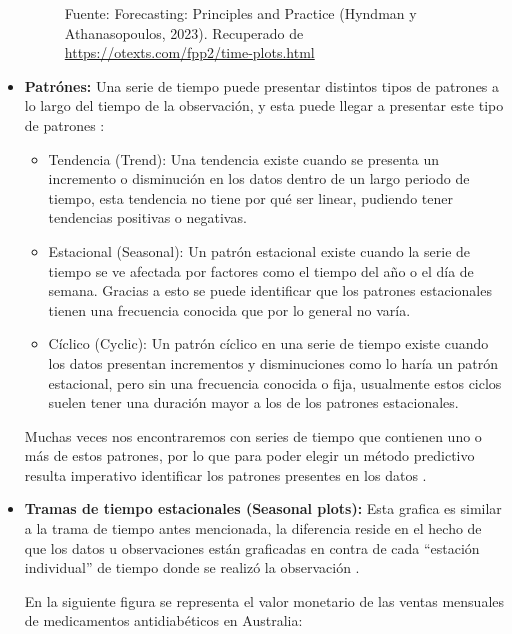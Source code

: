 \begin{itemize}
\begin{figure}[H]
        \begin{minipage}[t]{0.9\textwidth}
            Fuente: Forecasting: Principles and Practice (Hyndman y Athanasopoulos, 2023). Recuperado de \url{https://otexts.com/fpp2/time-plots.html}
        \end{minipage}
    \end{figure}
    
    \item \textbf{Patrónes:} Una serie de tiempo puede presentar distintos tipos de patrones a lo largo del tiempo de la observación, y esta puede llegar a presentar este tipo de patrones \cite{forecast-time-series-arima}:
        \begin{itemize}
            \item Tendencia (Trend): Una tendencia existe cuando se presenta un incremento o disminución en los datos dentro de un largo periodo de tiempo, esta tendencia no tiene por qué ser linear, pudiendo tener tendencias positivas o negativas.
            \item Estacional (Seasonal): Un patrón estacional existe cuando la serie de tiempo se ve afectada por factores como el tiempo del año o el día de semana. Gracias a esto se puede identificar que los patrones estacionales tienen una frecuencia conocida que por lo general no varía.
            \item Cíclico (Cyclic): Un patrón cíclico en una serie de tiempo existe cuando los datos presentan incrementos y disminuciones como lo haría un patrón estacional, pero sin una frecuencia conocida o fija, usualmente estos ciclos suelen tener una duración mayor a los de los patrones estacionales. 
        \end{itemize}

        Muchas veces nos encontraremos con series de tiempo que contienen uno o más de estos patrones, por lo que para poder elegir un método predictivo resulta imperativo identificar los patrones presentes en los datos \cite{forecast-time-series-arima}.

    \item \textbf{Tramas de tiempo estacionales (Seasonal plots):} Esta grafica es similar a la trama de tiempo antes mencionada, la diferencia reside en el hecho de que los datos u observaciones están graficadas en contra de cada “estación individual” de tiempo donde se realizó la observación \cite{forecast-time-series-arima}.
    
        En la siguiente figura se representa el valor monetario de las ventas mensuales de medicamentos antidiabéticos en Australia:
        

\end{itemize}
